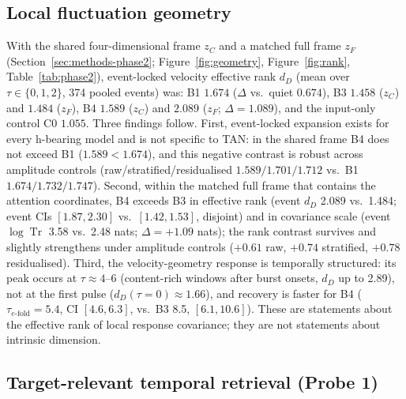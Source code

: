 \subsection{Local fluctuation geometry}\label{sec:res-phase2}

With the shared four-dimensional frame $z_C$ and a matched full frame
$z_F$ (Section~\ref{sec:methods-phase2}; Figure~\ref{fig:geometry},
Figure~\ref{fig:rank}, Table~\ref{tab:phase2}), event-locked velocity
effective rank $d_D$ (mean over $\tau \in \{0,1,2\}$, 374 pooled
events) was: B1 $1.674$ ($\Delta$ vs.\ quiet $0.674$), B3 $1.458$
($z_C$) and $1.484$ ($z_F$), B4 $1.589$ ($z_C$) and $2.089$ ($z_F$;
$\Delta = 1.089$), and the input-only control C0 $1.055$.  Three
findings follow.  First, event-locked expansion exists for every
h-bearing model and is not specific to TAN: in the shared frame B4 does
not exceed B1 ($1.589 < 1.674$), and this negative contrast is robust
across amplitude controls (raw/stratified/residualised
$1.589/1.701/1.712$ vs.\ B1 $1.674/1.732/1.747$).  Second, within the
matched full frame that contains the attention coordinates, B4 exceeds
B3 in effective rank (event $d_D$ 2.089 vs.\ 1.484; event CIs
$[1.87,2.30]$ vs.\ $[1.42,1.53]$, disjoint) and in covariance scale
(event $\log\operatorname{Tr}$ 3.58 vs.\ 2.48 nats; $\Delta = +1.09$
nats); the rank contrast survives and slightly strengthens under
amplitude controls ($+0.61$ raw, $+0.74$ stratified, $+0.78$
residualised).  Third, the velocity-geometry response is temporally
structured: its peak occurs at $\tau \approx 4$--$6$ (content-rich
windows after burst onsets, $d_D$ up to 2.89), not at the first pulse
($d_D(\tau{=}0) \approx 1.66$), and recovery is faster for B4
($\tau_{e\text{-fold}} = 5.4$, CI $[4.6,6.3]$, vs.\ B3 8.5,
$[6.1,10.6]$).  These are statements about the effective rank of local
response covariance; they are not statements about intrinsic dimension.

\subsection{Target-relevant temporal retrieval (Probe 1)}\label{sec:res-probe1}


